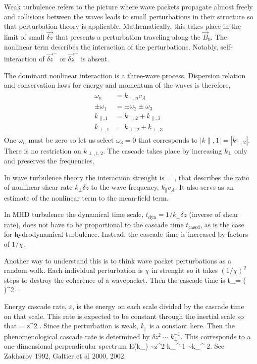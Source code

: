 \documentclass[usenatbib,twocolumn]{aastex63}
\newcommand{\tcascd}{t_\mathrm{cascd}} %
\begin{document}
Weak turbulence refers to the picture where wave packets propagate almost freely and collisions between the waves leads to small perturbations in their structure so that perturbation theory is applicable.
Mathematically, this takes place in the limit of small $\vec{\delta z}$ that presents a perturbation traveling along the $\vec{B}_0$.
The nonlinear term describes the interaction of the perturbations.
Notably, self-interaction of $\vec{\delta z}^-$ or $\vec{\delta z}^+$ is absent.

The dominant nonlinear interaction is a three-wave process.
Dispersion relation and conservation laws for energy and momentum of the waves is therefore,
\begin{align}\begin{split}
    \omega_n &= k_{\parallel,n} v_A \\
    \pm \omega_1 &= \pm \omega_2 \pm \omega_3 \\
    k_{\parallel,1} &= k_{\parallel,2} + k_{\parallel,3} \\
    k_{\perp,1} &= k_{\perp,2} + k_{\perp,3} 
\end{split}\end{align}
One $\omega_n$ must be zero so let us select $\omega_3=0$ that corresponds to $|k{\parallel,1}| = |k_{\parallel,2}|$.
There is no restriction on $k_{\perp,1,2}$.
The cascade takes place by increasing $k_\perp$ only and preserves the frequencies.

In wave turbulence theory the interaction strenght is
\be
\chi = ,
\ee
that describes the ratio of nonlinear shear rate $k_\perp \delta z$ to the wave frequency, $k_\parallel v_A$.
It also servs as an estimate of the nonlinear term to the mean-field term.

In MHD turbulence the dynamical time scale, $t_\mathrm{dyn} = 1/k_\perp \delta z$ (inverse of shear rate), does not have to be proportional to the cascade time $\tcascd$, as is the case for hydrodynamical turbulence.
Instead, the cascade time is increased  by factors of $1/\chi$.

Another way to understand this is to think wave packet perturbations as a random walk.
Each individual perturbation is $\chi$ in strenght so it takes $(1/\chi)^2$ steps to destroy the coherence of a wavepacket.
Then the cascade time is
\be
\tcascd =  \left(  \right)^2 = 
\ee

Energy cascade rate, $\varepsilon$, is the energy on each scale divided by the cascade time on that scale.
This rate is expected to be constant through the inertial scale so that
\be
\epsilon = \delta z^2 .
\ee
Since the perturbation is weak, $k_\parallel$ is a constant here.
Then the phenomenological cascade rate is determined by $\delta z^2 \sim k_\perp^{-1}$.
This corresponds to a one-dimensional perpendicular spectrum
\be
E(k_\perp) \sim \delta z^2 k_\perp^{-1} \sim k_\perp^{-2}.
\ee
See Zakharov 1992, Galtier et al 2000, 2002.
\end{document}
